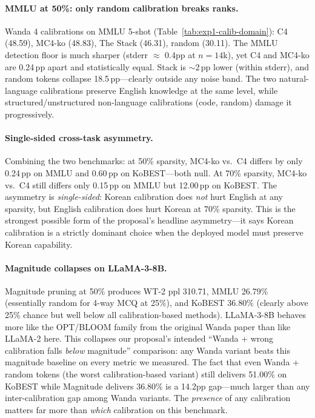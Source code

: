 \documentclass{article}
\begin{document}
\paragraph{MMLU at 50\%: only random calibration breaks ranks.}
Wanda 4 calibrations on MMLU 5-shot (Table~\ref{tab:exp1-calib-domain}):
C4 (48.59), MC4-ko (48.83), The Stack (46.31), random (30.11). The
MMLU detection floor is much sharper (stderr $\approx$ 0.4pp at
$n{=}14$k), yet C4 and MC4-ko are 0.24\,pp apart and statistically
equal. Stack is $\sim$2\,pp lower (within stderr), and random tokens
collapse 18.5\,pp---clearly outside any noise band. The two
natural-language calibrations preserve English knowledge at the same
level, while structured/unstructured non-language calibrations
(code, random) damage it progressively.

\paragraph{Single-sided cross-task asymmetry.} Combining the two
benchmarks: at 50\% sparsity, MC4-ko vs.\ C4 differs by only 0.24\,pp
on MMLU and 0.60\,pp on KoBEST---both null. At 70\% sparsity, MC4-ko
vs.\ C4 still differs only 0.15\,pp on MMLU but 12.00\,pp on KoBEST.
The asymmetry is \emph{single-sided}: Korean calibration does
\emph{not} hurt English at any sparsity, but English calibration does
hurt Korean at 70\% sparsity. This is the strongest possible form of
the proposal's headline asymmetry---it says Korean calibration is a
strictly dominant choice when the deployed model must preserve Korean
capability.

\paragraph{Magnitude collapses on LLaMA-3-8B.} Magnitude pruning at 50\%
produces WT-2 ppl 310.71, MMLU 26.79\% (essentially random for 4-way
MCQ at 25\%), and KoBEST 36.80\% (clearly above 25\% chance but well
below all calibration-based methods). LLaMA-3-8B behaves more like the
OPT/BLOOM family from the original Wanda paper than like LLaMA-2 here.
This collapses our proposal's intended ``Wanda + wrong calibration
falls \emph{below} magnitude'' comparison: any Wanda variant beats this
magnitude baseline on every metric we measured. The fact that even
Wanda + random tokens (the worst calibration-based variant) still
delivers 51.00\% on KoBEST while Magnitude delivers 36.80\% is a
14.2pp gap---much larger than any inter-calibration gap among Wanda
variants. The \emph{presence} of any calibration matters far more than
\emph{which} calibration on this benchmark.
\end{document}
